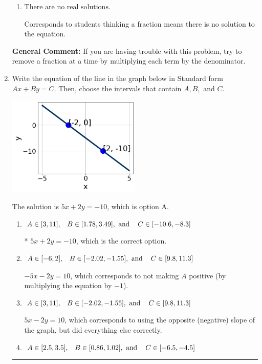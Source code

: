 \documentclass{extbook}[14pt]
\newcommand{\litem}[1]{\item #1

\rule{\textwidth}{0.4pt}}
\begin{document}
\begin{enumerate}
{\begin{enumerate}[label=\Alph*.]
* $x = 9.463$, which is the correct option.
\item \( \text{There are no real solutions.} \)

Corresponds to students thinking a fraction means there is no solution to the equation.
\end{enumerate}

\textbf{General Comment:} If you are having trouble with this problem, try to remove a fraction at a time by multiplying each term by the denominator.
}
\litem{
Write the equation of the line in the graph below in Standard form $Ax+By=C$. Then, choose the intervals that contain $A, B, \text{ and } C$.

\begin{center}
    \includegraphics[width=0.5\textwidth]{../Figures/linearGraphToStandardC.png}
\end{center}




The solution is \( 5x + 2y = -10 \), which is option A.\begin{enumerate}[label=\Alph*.]
\item \( A \in [3, 11], \hspace{3mm} B \in [1.78, 3.49], \text{ and } \hspace{3mm} C \in [-10.6, -8.3] \)

* $5x + 2y = -10$, which is the correct option.
\item \( A \in [-6, 2], \hspace{3mm} B \in [-2.02, -1.55], \text{ and } \hspace{3mm} C \in [9.8, 11.3] \)

 $-5x - 2y = 10$, which corresponds to not making $A$ positive (by multiplying the equation by $-1$).
\item \( A \in [3, 11], \hspace{3mm} B \in [-2.02, -1.55], \text{ and } \hspace{3mm} C \in [9.8, 11.3] \)

 $5x - 2y = 10$, which corresponds to using the opposite (negative) slope of the graph, but did everything else correctly.
\item \( A \in [2.5, 3.5], \hspace{3mm} B \in [0.86, 1.02], \text{ and } \hspace{3mm} C \in [-6.5, -4.5] \)


\end{enumerate}}
\end{enumerate}
\end{document}
